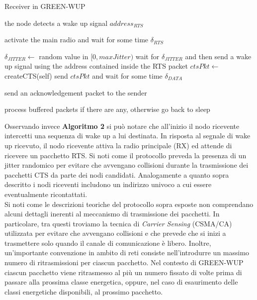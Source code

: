 \documentclass[binding=0.6cm,TFA]{sapthesis}
\begin{document}
\begin{algorithm}
    \caption{Receiver in GREEN-WUP}
    \begin{algorithmic}
        \REQUIRE the node detects a wake up signal $address_{RTS}$

            \STATE activate the main radio and wait for some time $\delta_{RTS}$

                \STATE $\delta_{JITTER} \leftarrow$ random value in $[0,maxJitter)$
                \STATE wait for $\delta_{JITTER}$ and then send a wake up signal using the address contained inside the RTS packet
                \STATE $ctsPkt \leftarrow$ createCTS(self)
                \STATE send $ctsPkt$ and wait for some time $\delta_{DATA}$

                    \STATE send an acknowledgement packet to the sender
                \ENDIF
            \ENDIF

            \STATE process buffered packets if there are any, otherwise go back to sleep
        
    \end{algorithmic}
\end{algorithm}

Osservando invece \textbf{Algoritmo 2} si può notare che all'inizio il nodo ricevente intercetti una sequenza di wake up a lui destinata. In risposta
al segnale di wake up ricevuto, il nodo ricevente attiva la radio principale (RX) ed attende di ricevere un pacchetto RTS. Si noti come il
protocollo preveda la presenza di un jitter randomico per evitare che avvengano collisioni durante la trasmissione dei pacchetti CTS da parte
dei nodi candidati. Analogamente a quanto sopra descritto i nodi riceventi includono un indirizzo univoco a cui essere eventualmente ricontattati.\\

Si noti come le descrizioni teoriche del protocollo sopra esposte non comprendano alcuni dettagli inerenti al meccanismo di trasmissione
dei pacchetti. In particolare, tra questi troviamo la tecnica di \emph{Carrier Sensing} (CSMA/CA) utilizzata per evitare che avvengano collisioni
e che prevede che si inizi a trasmettere solo quando il canale di comunicazione è libero. Inoltre, un'importante convenzione in ambito di reti consiste
nell'introdurre un massimo numero di ritrasmissioni per ciascun pacchetto. Nel contesto di GREEN-WUP ciascun pacchetto viene ritrasmesso
al più un numero fissato di volte prima di passare alla prossima classe energetica, oppure, nel caso di esaurimento delle classi energetiche
disponibili, al prossimo pacchetto.
\end{document}
